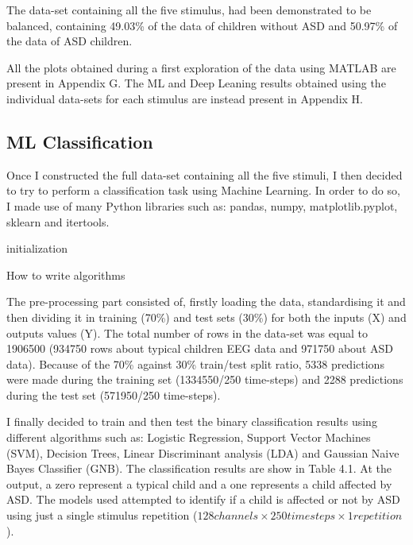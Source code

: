 The data-set containing all the five stimulus, had been demonstrated to be balanced, containing 49.03\% of the data of children without ASD and 50.97\% of the data of ASD children. 

All the plots obtained during a first exploration of the data using MATLAB are present in Appendix G. The ML and Deep Leaning results obtained using the individual data-sets for each stimulus are instead present in Appendix H.  

\subsection{ML Classification}
Once I constructed the full data-set containing all the five stimuli, I then decided to try to perform a classification task using Machine Learning. In order to do so, I made use of many Python libraries such as: pandas, numpy, matplotlib.pyplot, sklearn and itertools.

\begin{algorithm}[H]
\SetAlgoLined
{}
 initialization\;
 \caption{How to write algorithms}
\end{algorithm}

The pre-processing part consisted of, firstly loading the data, standardising it and then dividing it in training (70\%) and test sets (30\%) for both the inputs (X) and outputs values (Y). The total number of rows in the data-set was equal to 1906500 (934750 rows about typical children EEG data and 971750 about ASD data). Because of the 70\% against 30\% train/test split ratio, 5338 predictions were made during the training set (1334550/250 time-steps) and 2288 predictions during the test set (571950/250 time-steps).

I finally decided to train and then test the binary classification results using different algorithms such as: Logistic Regression, Support Vector Machines (SVM), Decision Trees, Linear Discriminant analysis (LDA) and Gaussian Naive Bayes Classifier (GNB). The classification results are show in Table 4.1. At the output, a zero represent a typical child and a one represents a child affected by ASD. The models used attempted to identify if a child is affected or not by ASD using just a single stimulus repetition ($128 channels \times250 timesteps \times1 repetition$).

